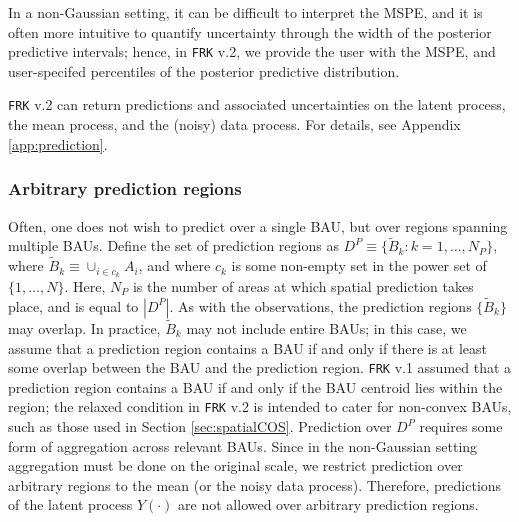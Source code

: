 \documentclass[12pt,a4paper]{article}
\begin{document}
In a non-Gaussian setting, it can be difficult to interpret the MSPE, and it is often more intuitive to quantify uncertainty through the width of the posterior predictive intervals; hence, in \texttt{FRK} v.2, we provide the user with the MSPE, and user-specifed percentiles of the posterior predictive distribution.


\texttt{FRK} v.2 can return predictions and associated uncertainties on the latent process, the mean process, and the (noisy) data process. For details, see Appendix \ref{app:prediction}. 




\subsubsection{Arbitrary prediction regions}


Often, one does not wish to predict over a single BAU, but over regions spanning multiple BAUs.
Define the set of prediction regions as 
$D^P \equiv \{\tilde{B}_k : k = 1, \dots, N_P\}$, where $\tilde{B}_k \equiv \cup_{i\in c_k} A_i$, and where $c_k$ is some non-empty set in the power set of $\{1, \dots, N\}$. 
Here, $N_P$ is the number of areas at which spatial prediction takes place, and is equal to $|D^P|$.
As with the observations, the prediction regions $\{\tilde{B}_k\}$ may overlap. 
In practice, $\tilde{B}_k$  may not include entire BAUs; in this case, we assume that a prediction region contains a BAU if and only if there is at least some overlap between the BAU and the prediction region.
\texttt{FRK} v.1 assumed that a prediction region contains a BAU if and only if the BAU centroid lies within the region; the relaxed condition in \texttt{FRK} v.2 is intended to cater for non-convex BAUs, such as those used in Section \ref{sec:spatialCOS}.
Prediction over $D^P$ requires some form of aggregation across relevant BAUs.
Since in the non-Gaussian setting aggregation must be done on the original scale, we restrict prediction over arbitrary regions to the mean (or the noisy data process).  
Therefore, predictions of the latent process $Y(\cdot)$ are not allowed over arbitrary prediction regions.
\end{document}
